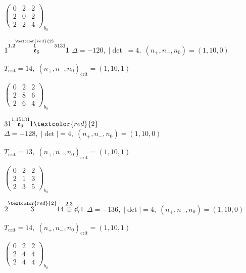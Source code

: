 \documentclass[10pt]{article}
\begin{document}
\hspace{2em}$\left(\begin{smallmatrix}0 & 2 & 2 \\ 2 & 0 & 2 \\ 2 & 2 & 4\end{smallmatrix}\right)_{\!b_0}$

\smallskip

$1\overset{1,2\overset{\textcolor{red}{2}}{1}5131}{\mathfrak{e}_6}1$ \quad $\Delta=-120,\; |\det|=4,\; (n_+,n_-,n_0)=(1,10,0)$

\hspace{1em}$T_{\text{crit}}=14,\; (n_+,n_-,n_0)_{\text{crit}}=(1,10,1)$

\hspace{2em}$\left(\begin{smallmatrix}0 & 2 & 2 \\ 2 & 8 & 6 \\ 2 & 6 & 4\end{smallmatrix}\right)_{\!b_0}$

\smallskip

$31\overset{1,15131}{\mathfrak{e}_6}1\textcolor{red}{2}$ \quad $\Delta=-128,\; |\det|=4,\; (n_+,n_-,n_0)=(1,10,0)$

\hspace{1em}$T_{\text{crit}}=13,\; (n_+,n_-,n_0)_{\text{crit}}=(1,10,1)$

\hspace{2em}$\left(\begin{smallmatrix}0 & 2 & 2 \\ 2 & 1 & 3 \\ 2 & 3 & 5\end{smallmatrix}\right)_{\!b_0}$

\smallskip

$2\overset{\textcolor{red}{2}}{3}14\overset{2,3}{\otimes}\mathfrak{e}_7'1$ \quad $\Delta=-136,\; |\det|=4,\; (n_+,n_-,n_0)=(1,10,0)$

\hspace{1em}$T_{\text{crit}}=14,\; (n_+,n_-,n_0)_{\text{crit}}=(1,10,1)$

\hspace{2em}$\left(\begin{smallmatrix}0 & 2 & 2 \\ 2 & 4 & 4 \\ 2 & 4 & 4\end{smallmatrix}\right)_{\!b_0}$
\end{document}
